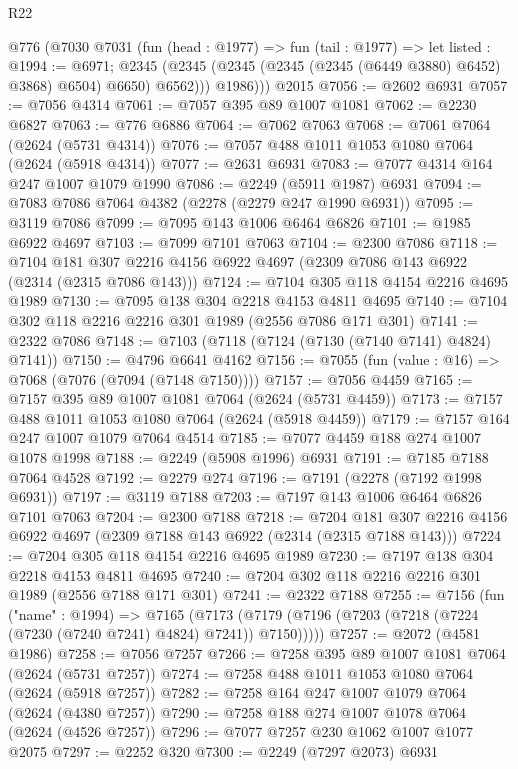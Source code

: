 \begin{lexlean}{R22}
\begin{coremodule}
        @776
          (@7030
            @7031
            (fun (head : @1977) =>
            fun (tail : @1977) =>
            let listed : @1994 := @6971;
            @2345 (@2345 (@2345 (@2345 (@2345 (@6449 @3880) @6452) @3868) @6504) @6650) @6562)))
          @1986)))
    @2015
@7056 := @2602 @6931
@7057 := @7056 @4314
@7061 := @7057 @395 @89 @1007 @1081
@7062 := @2230 @6827
@7063 := @776 @6886
@7064 := @7062 @7063
@7068 := @7061 @7064 (@2624 (@5731 @4314))
@7076 := @7057 @488 @1011 @1053 @1080 @7064 (@2624 (@5918 @4314))
@7077 := @2631 @6931
@7083 := @7077 @4314 @164 @247 @1007 @1079 @1990
@7086 := @2249 (@5911 @1987) @6931
@7094 := @7083 @7086 @7064 @4382 (@2278 (@2279 @247 @1990 @6931))
@7095 := @3119 @7086
@7099 := @7095 @143 @1006 @6464 @6826
@7101 := @1985 @6922 @4697
@7103 := @7099 @7101 @7063
@7104 := @2300 @7086
@7118 := @7104 @181 @307 @2216 @4156 @6922 @4697 (@2309 @7086 @143 @6922 (@2314 (@2315 @7086 @143)))
@7124 := @7104 @305 @118 @4154 @2216 @4695 @1989
@7130 := @7095 @138 @304 @2218 @4153 @4811 @4695
@7140 := @7104 @302 @118 @2216 @2216 @301 @1989 (@2556 @7086 @171 @301)
@7141 := @2322 @7086
@7148 := @7103 (@7118 (@7124 (@7130 (@7140 @7141) @4824) @7141))
@7150 := @4796 @6641 @4162
@7156 := @7055 (fun (value : @16) => @7068 (@7076 (@7094 (@7148 @7150))))
@7157 := @7056 @4459
@7165 := @7157 @395 @89 @1007 @1081 @7064 (@2624 (@5731 @4459))
@7173 := @7157 @488 @1011 @1053 @1080 @7064 (@2624 (@5918 @4459))
@7179 := @7157 @164 @247 @1007 @1079 @7064 @4514
@7185 := @7077 @4459 @188 @274 @1007 @1078 @1998
@7188 := @2249 (@5908 @1996) @6931
@7191 := @7185 @7188 @7064 @4528
@7192 := @2279 @274
@7196 := @7191 (@2278 (@7192 @1998 @6931))
@7197 := @3119 @7188
@7203 := @7197 @143 @1006 @6464 @6826 @7101 @7063
@7204 := @2300 @7188
@7218 := @7204 @181 @307 @2216 @4156 @6922 @4697 (@2309 @7188 @143 @6922 (@2314 (@2315 @7188 @143)))
@7224 := @7204 @305 @118 @4154 @2216 @4695 @1989
@7230 := @7197 @138 @304 @2218 @4153 @4811 @4695
@7240 := @7204 @302 @118 @2216 @2216 @301 @1989 (@2556 @7188 @171 @301)
@7241 := @2322 @7188
@7255 := @7156
    (fun ("name" : @1994) =>
    @7165 (@7173 (@7179 (@7196 (@7203 (@7218 (@7224 (@7230 (@7240 @7241) @4824) @7241)) @7150)))))
@7257 := @2072 (@4581 @1986)
@7258 := @7056 @7257
@7266 := @7258 @395 @89 @1007 @1081 @7064 (@2624 (@5731 @7257))
@7274 := @7258 @488 @1011 @1053 @1080 @7064 (@2624 (@5918 @7257))
@7282 := @7258 @164 @247 @1007 @1079 @7064 (@2624 (@4380 @7257))
@7290 := @7258 @188 @274 @1007 @1078 @7064 (@2624 (@4526 @7257))
@7296 := @7077 @7257 @230 @1062 @1007 @1077 @2075
@7297 := @2252 @320
@7300 := @2249 (@7297 @2073) @6931

\end{coremodule}
\end{lexlean}
